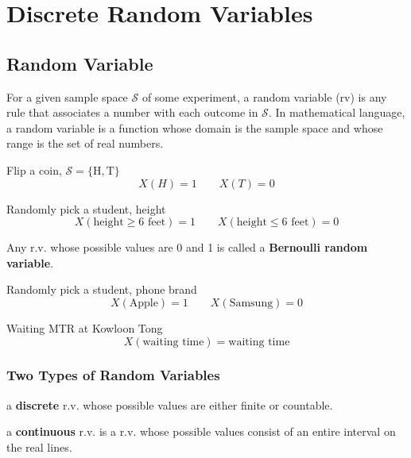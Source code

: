 \chapter{Discrete Random Variables}
\section{Random Variable}
\begin{defn}
  For a given sample space $\mathcal{S}$ of some experiment, a random variable (rv) is any rule that associates a number with each outcome in $\mathcal{S}$. In mathematical language, a random variable is a function whose domain is the sample space
and whose range is the set of real numbers.
\end{defn}

\begin{exmp}
Flip a coin, $\mathcal{S}=\{\text{H} ,\text{T} \}$
\[X(H) = 1 \qquad X(T) =0 \]
\end{exmp}

\begin{exmp}
Randomly pick a student, height
\[X(\text{height}\geq \text{6 feet})=1  \qquad X(\text{height}\leq \text{6 feet})=0
\]
\end{exmp}

\begin{defn}
Any r.v. whose possible values are 0 and 1 is called a \textbf{Bernoulli random variable}.
\end{defn}

\begin{exmp}
Randomly pick a student, phone brand
\[X(\text{Apple})=1 \qquad  X(\text{Samsung})=0	\]
\end{exmp}

\begin{exmp}
Waiting MTR at Kowloon Tong
\[X(\text{waiting time})=\text{waiting time}\]
\end{exmp}

\subsection{Two Types of Random Variables}
\begin{defn}
a \textbf{discrete} r.v. whose possible values are either finite or countable.

a \textbf{continuous} r.v. is a r.v. whose possible values consist of an entire interval on the real lines.
\end{defn}


